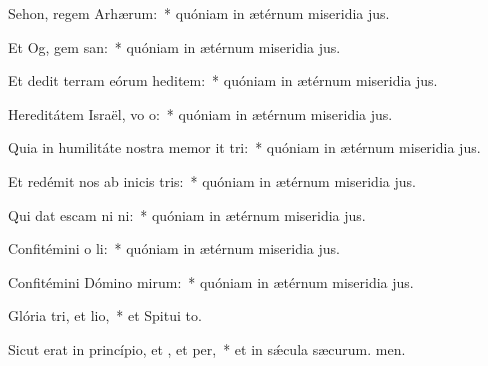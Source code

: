 \item Sehon, regem Arhærum:~* quóniam in ætérnum miseridia jus.
\item Et Og, gem san:~* quóniam in ætérnum miseridia jus.
\item Et dedit terram eórum heditem:~* quóniam in ætérnum miseridia jus.
\item Hereditátem Israël, vo o:~* quóniam in ætérnum miseridia jus.
\item Quia in humilitáte nostra memor it tri:~* quóniam in ætérnum miseridia jus.
\item Et redémit nos ab inicis tris:~* quóniam in ætérnum miseridia jus.
\item Qui dat escam ni ni:~* quóniam in ætérnum miseridia jus.
\item Confitémini o li:~* quóniam in ætérnum miseridia jus.
\item Confitémini Dómino mirum:~* quóniam in ætérnum miseridia jus.
\item Glória tri, et lio,~* et Spitui to.
\item Sicut erat in princípio, et , et per,~* et in sǽcula sæcurum. men.
